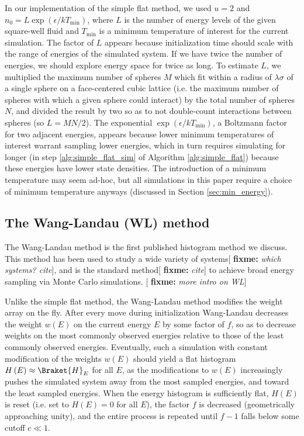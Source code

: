 \documentclass[11pt]{article}
\newcommand{\bk}{\Braket} %
\renewcommand{\t}{\text} %
\newcommand{\p}[1]{\left(#1\right)} %
\newcommand{\red}[1]{{\bf \color{red} #1}}
\newcommand{\fixme}[1]{[\red{fixme:} \emph{#1}]}
\begin{document}
In our implementation of the simple flat method, we used $u=2$ and
$n_0=L\exp\p{\epsilon/kT_{\t{min}}}$, where $L$ is the number of
energy levels of the given square-well fluid and $T_{\t{min}}$ is a
minimum temperature of interest for the current simulation. The factor
of $L$ appears because initialization time should scale with the range
of energies of the simulated system. If we have twice the number of
energies, we should explore energy space for twice as long. To
estimate $L$, we multiplied the maximum number of spheres $M$ which
fit within a radius of $\lambda\sigma$ of a single sphere on a
face-centered cubic lattice (i.e. the maximum number of spheres with
which a given sphere could interact) by the total number of spheres
$N$, and divided the result by two so as to not double-count
interactions between spheres (so $L=MN/2$). The exponential
$\exp\p{\epsilon/kT_{\t{min}}}$, a Boltzmann factor for two adjacent
energies, appears because lower minimum temperatures of interest
warrant sampling lower energies, which in turn requires simulating for
longer (in step \ref{alg:simple_flat_sim} of Algorithm
\ref{alg:simple_flat}) because these energies have lower state
densities. The introduction of a minimum temperature may seem ad-hoc,
but all simulations in this paper require a choice of minimum
temperature anyways (discussed in Section \ref{sec:min_energy}).

\subsection{The Wang-Landau (WL) method}
\label{sec:wang_landau}

The Wang-Landau method is the first published histogram method we
discuss\cite{wang_landau, wang_landau_mod, wang_landau_analysis}. This
method has been used to study a wide variety of systems\fixme{which
  systems? cite}, and is the standard method\fixme{cite} to achieve
broad energy sampling via Monte Carlo simulations. \fixme{more intro
  on WL}

Unlike the simple flat method, the Wang-Landau method modifies the
weight array on the fly. After every move during initialization
Wang-Landau decreases the weight $w\p{E}$ on the current energy $E$ by
some factor of $f$, so as to decrease weights on the most commonly
observed energies relative to those of the least commonly observed
energies. Eventually, such a simulation with constant modification of
the weights $w\p{E}$ should yield a flat histogram
$H\p{E}\approx\bk{H}_E$ for all $E$, as the modifications to $w\p{E}$
increasingly pushes the simulated system away from the most sampled
energies, and toward the least sampled energies. When the energy
histogram is sufficiently flat, $H\p{E}$ is reset (i.e. set to
$H\p{E}=0$ for all $E$), the factor $f$ is decreased (geometrically
approaching unity), and the entire process is repeated until $f-1$
falls below some cutoff $c\ll 1$.
\end{document}
